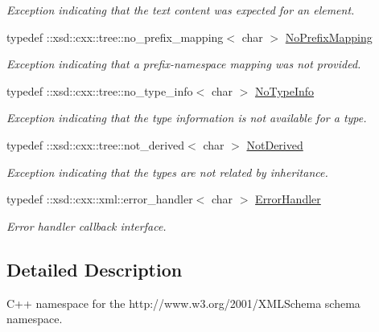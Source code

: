 \begin{DoxyCompactItemize}
\begin{DoxyCompactList}\small\item\em Exception indicating that the text content was expected for an element. \item\end{DoxyCompactList}\item 
\hypertarget{namespacexml__schema_ac1001885bc0f0942758a60c65c028058}{
typedef ::xsd::cxx::tree::no\_\-prefix\_\-mapping$<$ char $>$ \hyperlink{namespacexml__schema_ac1001885bc0f0942758a60c65c028058}{NoPrefixMapping}}
\label{namespacexml__schema_ac1001885bc0f0942758a60c65c028058}

\begin{DoxyCompactList}\small\item\em Exception indicating that a prefix-\/namespace mapping was not provided. \item\end{DoxyCompactList}\item 
\hypertarget{namespacexml__schema_a7a2506434a2f51df9fee6ec7dc0ad12e}{
typedef ::xsd::cxx::tree::no\_\-type\_\-info$<$ char $>$ \hyperlink{namespacexml__schema_a7a2506434a2f51df9fee6ec7dc0ad12e}{NoTypeInfo}}
\label{namespacexml__schema_a7a2506434a2f51df9fee6ec7dc0ad12e}

\begin{DoxyCompactList}\small\item\em Exception indicating that the type information is not available for a type. \item\end{DoxyCompactList}\item 
\hypertarget{namespacexml__schema_af5fd843f86d4a67881d295326ee79bf4}{
typedef ::xsd::cxx::tree::not\_\-derived$<$ char $>$ \hyperlink{namespacexml__schema_af5fd843f86d4a67881d295326ee79bf4}{NotDerived}}
\label{namespacexml__schema_af5fd843f86d4a67881d295326ee79bf4}

\begin{DoxyCompactList}\small\item\em Exception indicating that the types are not related by inheritance. \item\end{DoxyCompactList}\item 
\hypertarget{namespacexml__schema_ab1c9361bfd3b404eaabf0c31eded79dc}{
typedef ::xsd::cxx::xml::error\_\-handler$<$ char $>$ \hyperlink{namespacexml__schema_ab1c9361bfd3b404eaabf0c31eded79dc}{ErrorHandler}}
\label{namespacexml__schema_ab1c9361bfd3b404eaabf0c31eded79dc}

\begin{DoxyCompactList}\small\item\em Error handler callback interface. \item\end{DoxyCompactList}\end{DoxyCompactItemize}


\subsection{Detailed Description}
C++ namespace for the http://www.w3.org/2001/XMLSchema schema namespace. 